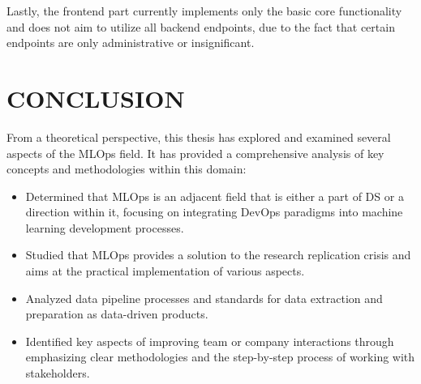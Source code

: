 Lastly, the frontend part currently implements only the basic core functionality and does not aim to utilize all backend endpoints, due to the fact that certain endpoints are only administrative or insignificant.

\clearpage

\chapter*[Conclusion and results]{CONCLUSION}
From a theoretical perspective, this thesis has explored and examined several aspects of the MLOps field. It has provided a comprehensive analysis of key concepts and methodologies within this domain:
\begin{itemize}
    \item Determined that MLOps is an adjacent field that is either a part of DS or a direction within it, focusing on integrating DevOps paradigms into machine learning development processes.
    \item Studied that MLOps provides a solution to the research replication crisis and aims at the practical implementation of various aspects.
    \item Analyzed data pipeline processes and standards for data extraction and preparation as data-driven products.
    \item Identified key aspects of improving team or company interactions through emphasizing clear methodologies and the step-by-step process of working with stakeholders.
\end{itemize}

